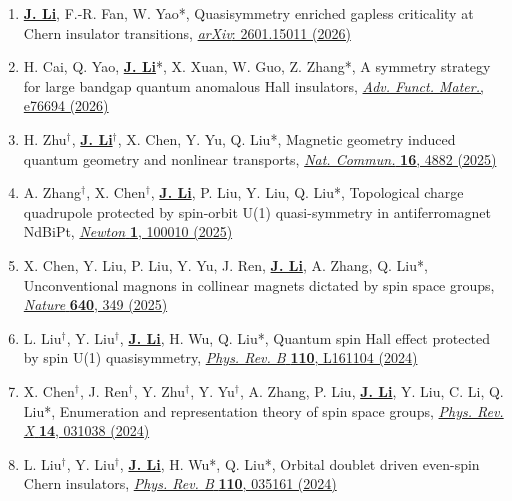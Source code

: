 \documentclass[a4paper,11pt]{article}
\begin{document}
\begin{enumerate}[leftmargin=*]

    \item \underline{\textbf{J. Li}}, F.-R. Fan, W. Yao*, Quasisymmetry enriched gapless criticality at Chern insulator transitions, \href{https://arxiv.org/abs/2601.15011}{\textit{arXiv}: 2601.15011 (2026)}

    \item H. Cai, Q. Yao, \underline{\textbf{J. Li}}*, X. Xuan, W. Guo, Z. Zhang*, A symmetry strategy for large bandgap quantum anomalous Hall insulators, \href{https://doi.org/10.1002/adfm.76694}{\textit{Adv. Funct. Mater.}, e76694 (2026)}

    \item H. Zhu$^{\dagger}$, \underline{\textbf{J. Li}}$^{\dagger}$, X. Chen, Y. Yu, Q. Liu*, Magnetic geometry induced quantum geometry and nonlinear transports, \href{https://doi.org/10.1038/s41467-025-60128-2}{\textit{Nat. Commun.} \textbf{16}, 4882 (2025)}

    \item A. Zhang$^{\dagger}$, X. Chen$^{\dagger}$, \underline{\textbf{J. Li}}, P. Liu, Y. Liu, Q. Liu*, Topological charge quadrupole protected by spin-orbit U(1) quasi-symmetry in antiferromagnet NdBiPt, \href{https://doi.org/10.1016/j.newton.2025.100010}{\textit{Newton} \textbf{1}, 100010 (2025)}

    \item X. Chen, Y. Liu, P. Liu, Y. Yu, J. Ren, \underline{\textbf{J. Li}}, A. Zhang, Q. Liu*, Unconventional magnons in collinear magnets dictated by spin space groups, \href{https://doi.org/10.1038/s41586-025-08715-7}{\textit{Nature} \textbf{640}, 349 (2025)}

    \item L. Liu$^{\dagger}$, Y. Liu$^{\dagger}$, \underline{\textbf{J. Li}}, H. Wu, Q. Liu*, Quantum spin Hall effect protected by spin U(1) quasisymmetry, \href{https://doi.org/10.1103/PhysRevB.110.L161104}{\textit{Phys. Rev. B} \textbf{110}, L161104 (2024)}

    \item X. Chen$^{\dagger}$, J. Ren$^{\dagger}$, Y. Zhu$^{\dagger}$, Y. Yu$^{\dagger}$, A. Zhang, P. Liu, \underline{\textbf{J. Li}}, Y. Liu, C. Li, Q. Liu*, Enumeration and representation theory of spin space groups, \href{https://doi.org/10.1103/PhysRevX.14.031038}{\textit{Phys. Rev. X} \textbf{14}, 031038 (2024)}

    \item L. Liu$^{\dagger}$, Y. Liu$^{\dagger}$, \underline{\textbf{J. Li}}, H. Wu*, Q. Liu*, Orbital doublet driven even-spin Chern insulators, \href{https://doi.org/10.1103/PhysRevB.110.035161}{\textit{Phys. Rev. B} \textbf{110}, 035161 (2024)}


\end{enumerate}
\end{document}
